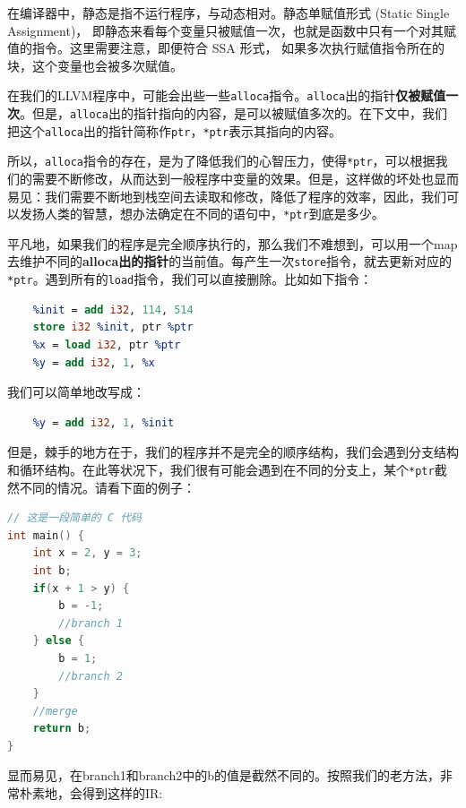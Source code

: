 在编译器中，静态是指不运行程序，与动态相对。静态单赋值形式 (Static Single Assignment)，
即静态来看每个变量只被赋值一次，也就是函数中只有一个对其赋值的指令。这里需要注意，即便符合 SSA 形式，
如果多次执行赋值指令所在的块，这个变量也会被多次赋值。

在我们的LLVM程序中，可能会出些一些\texttt{alloca}指令。\texttt{alloca}出的指针\textbf{仅被赋值一次}。但是，\texttt{alloca}出的指针指向的内容，是可以被赋值多次的。在下文中，我们把这个\texttt{alloca}出的指针简称作\texttt{ptr}，\texttt{*ptr}表示其指向的内容。

所以，\texttt{alloca}指令的存在，是为了降低我们的心智压力，使得\texttt{*ptr}，可以根据我们的需要不断修改，从而达到一般程序中变量的效果。但是，这样做的坏处也显而易见：我们需要不断地到栈空间去读取和修改，降低了程序的效率，因此，我们可以发扬人类的智慧，想办法确定在不同的语句中，\texttt{*ptr}到底是多少。

平凡地，如果我们的程序是完全顺序执行的，那么我们不难想到，可以用一个map去维护不同的\textbf{alloca出的指针}的当前值。每产生一次\texttt{store}指令，就去更新对应的\texttt{*ptr}。遇到所有的\texttt{load}指令，我们可以直接删除。比如如下指令：

\begin{lstlisting}[language=LLVM]
    %ptr = alloca i32
    %init = add i32, 114, 514
    store i32 %init, ptr %ptr
    %x = load i32, ptr %ptr
    %y = add i32, 1, %x
\end{lstlisting}

我们可以简单地改写成：

\begin{lstlisting}[language=LLVM]
    %init = add i32, 114, 514
    %y = add i32, 1, %init
\end{lstlisting}

但是，棘手的地方在于，我们的程序并不是完全的顺序结构，我们会遇到分支结构和循环结构。在此等状况下，我们很有可能会遇到在不同的分支上，某个\texttt{*ptr}截然不同的情况。请看下面的例子：

\begin{lstlisting}[language=C]
// 这是一段简单的 C 代码
int main() {
    int x = 2, y = 3;
    int b;
    if(x + 1 > y) {
        b = -1;
        //branch 1
    } else {
        b = 1;
        //branch 2
    }
    //merge
    return b;
}
\end{lstlisting}

显而易见，在branch1和branch2中的b的值是截然不同的。按照我们的老方法，非常朴素地，会得到这样的IR:

